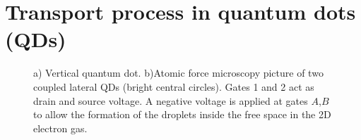\section{Transport process in quantum dots (QDs) \label{sec:trans}}
\begin{figure}[hbt]
    \centering
    \hspace{6mm}
    \caption{ \label{fig:QD} a) Vertical quantum dot.  b)Atomic force microscopy
    picture of two coupled lateral QDs (bright central circles). Gates 1 and 2 act as drain and source voltage. A negative
    voltage is applied at gates $A$,$B$ to allow the formation of the droplets inside the free space in the 2D electron gas. \protect{} }
\end{figure}

